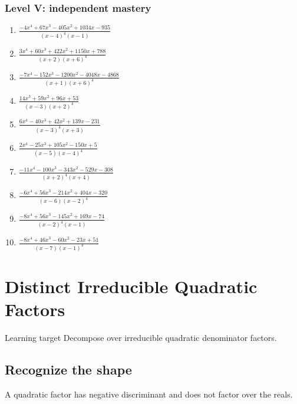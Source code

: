 \documentclass[11pt,oneside]{book}
\begin{document}
\subsection*{Level V: independent mastery}
\begin{enumerate}[leftmargin=*,label=\textbf{\arabic*.},itemsep=0.65\baselineskip]
\item $\displaystyle \frac{- 4 x^{4} + 67 x^{3} - 405 x^{2} + 1034 x - 935}{\left(x - 4\right)^{4} \left(x - 1\right)}$
\item $\displaystyle \frac{3 x^{4} + 60 x^{3} + 422 x^{2} + 1150 x + 788}{\left(x + 2\right) \left(x + 6\right)^{4}}$
\item $\displaystyle \frac{- 7 x^{4} - 152 x^{3} - 1200 x^{2} - 4048 x - 4868}{\left(x + 1\right) \left(x + 6\right)^{4}}$
\item $\displaystyle \frac{14 x^{3} + 59 x^{2} + 96 x + 53}{\left(x - 3\right) \left(x + 2\right)^{4}}$
\item $\displaystyle \frac{6 x^{4} - 40 x^{3} + 42 x^{2} + 139 x - 231}{\left(x - 3\right)^{4} \left(x + 3\right)}$
\item $\displaystyle \frac{2 x^{4} - 25 x^{3} + 105 x^{2} - 150 x + 5}{\left(x - 5\right) \left(x - 4\right)^{4}}$
\item $\displaystyle \frac{- 11 x^{4} - 100 x^{3} - 343 x^{2} - 529 x - 308}{\left(x + 2\right)^{4} \left(x + 4\right)}$
\item $\displaystyle \frac{- 6 x^{4} + 56 x^{3} - 214 x^{2} + 404 x - 320}{\left(x - 6\right) \left(x - 2\right)^{4}}$
\item $\displaystyle \frac{- 8 x^{4} + 56 x^{3} - 145 x^{2} + 169 x - 74}{\left(x - 2\right)^{4} \left(x - 1\right)}$
\item $\displaystyle \frac{- 8 x^{4} + 46 x^{3} - 60 x^{2} - 23 x + 51}{\left(x - 7\right) \left(x - 1\right)^{4}}$
\end{enumerate}
\chapter{Distinct Irreducible Quadratic Factors}
\begin{rulebox}{Learning target}
Decompose over irreducible quadratic denominator factors.
\end{rulebox}
\section{Recognize the shape}
A quadratic factor has negative discriminant and does not factor over the reals.
\end{document}
